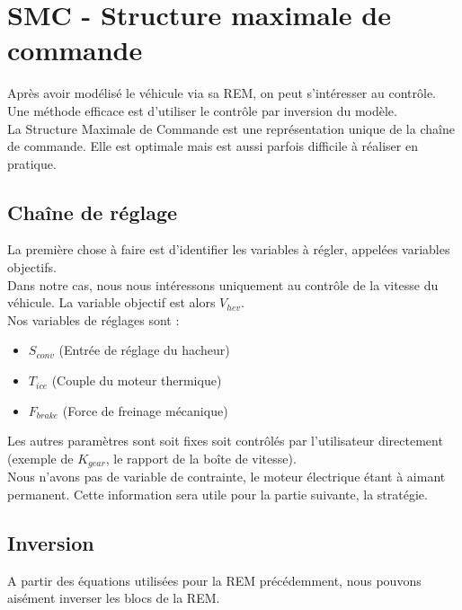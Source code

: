 \section{SMC - Structure maximale de commande}
Après avoir modélisé le véhicule via sa REM, on peut s'intéresser au contrôle. Une méthode efficace est d'utiliser le contrôle par inversion du modèle.\\

La Structure Maximale de Commande est une représentation unique de la chaîne de commande. Elle est optimale mais est aussi parfois difficile à réaliser en pratique.\\

\subsection{Chaîne de réglage}
La première chose à faire est d'identifier les variables à régler, appelées variables objectifs.\\
Dans notre cas, nous nous intéressons uniquement au contrôle de la vitesse du véhicule. La variable objectif est alors $V_{hev}$.\\

Nos variables de réglages sont : 
\begin{itemize}
\item $S_{conv}$ (Entrée de réglage du hacheur)
\item $T_{ice}$ (Couple du moteur thermique)
\item $F_{brake}$ (Force de freinage mécanique)
\end{itemize}

Les autres paramètres sont soit fixes soit contrôlés par l'utilisateur directement (exemple de $K_{gear}$, le rapport de la boîte de vitesse).\\

Nous n'avons pas de variable de contrainte, le moteur électrique étant à aimant permanent. Cette information sera utile pour la partie suivante, la stratégie.\\


\subsection{Inversion}
A partir des équations utilisées pour la REM précédemment, nous pouvons aisément inverser les blocs de la REM.\\

